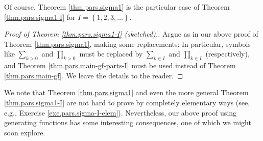 Of course, Theorem \ref{thm.pars.sigma1} is the particular case of Theorem
\ref{thm.pars.sigma1-I} for $I=\left\{  1,2,3,\ldots\right\}  $.

\begin{proof}
[Proof of Theorem \ref{thm.pars.sigma1-I} (sketched).]Argue as in our above
proof of Theorem \ref{thm.pars.sigma1}, making some replacements: In
particular, symbols like $\sum\limits_{k>0}$ and $\prod\limits_{k>0}$ must be
replaced by $\sum\limits_{k\in I}$ and $\prod\limits_{k\in I}$ (respectively),
and Theorem \ref{thm.pars.main-gf-parts-I} must be used instead of Theorem
\ref{thm.pars.main-gf}. We leave the details to the reader.
\end{proof}

We note that Theorem \ref{thm.pars.sigma1} and even the more general Theorem
\ref{thm.pars.sigma1-I} are not hard to prove by completely elementary ways
(see, e.g., Exercise \ref{exe.pars.sigma-I-elem}). Nevertheless, our above
proof using generating functions has some interesting consequences, one of
which we might soon explore.
